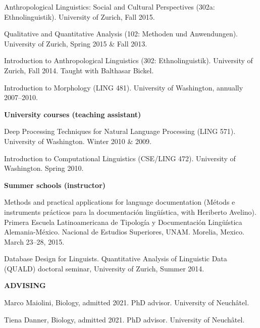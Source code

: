 \documentclass[11pt]{article}
\newcommand{\hangpara}{
 \setlength{\parindent}{0in} %
 \hangindent=0.42in %
}
\begin{document}
\vskip 6pt
\hangpara Anthropological Linguistics: Social and Cultural Perspectives (302a: Ethnolinguistik). University of Zurich, Fall 2015.

\vskip 6pt
\hangpara Qualitative and Quantitative Analysis (102: Methoden und Anwendungen). University of Zurich, Spring 2015 \& Fall 2013.

\vskip 6pt
\hangpara Introduction to Anthropological Linguistics (302: Ethnolinguistik). University of Zurich, Fall 2014. Taught with Balthasar Bickel.

\vskip 6pt
\hangpara Introduction to Morphology (LING 481). University of Washington, annually 2007--2010.

\begin{flushleft}
{\bf University courses (teaching assistant)}
\end{flushleft}
\hangpara Deep Processing Techniques for Natural Language Processing (LING 571). University of Washington. Winter 2010 \& 2009.

\vskip 6pt
\hangpara %
Introduction to Computational Linguistics (CSE/LING 472). University of Washington. Spring 2010.

\begin{flushleft}
{\bf Summer schools (instructor)}
\end{flushleft}
\hangpara Methods and practical applications for language documentation (M{\'e}tods e instruments pr{\'a}cticos para la documentaci{\'o}n ling{\"u}{\'i}stica, with Heriberto Avelino). Primera Escuela Latinoamericana de Tipolog{\'i}a y Documentaci{\'o}n Ling{\"u}{\'i}stica Alemania-M{\'e}xico. Nacional de Estudios Superiores, UNAM. Morelia, Mexico. March 23--28, 2015.

\vskip 6pt
\hangpara Database Design for Linguists. Quantitative Analysis of Linguistic Data (QUALD) doctoral seminar, University of Zurich, Summer 2014.


\vskip 20pt
\begin{flushleft}
{\bf ADVISING}
\end{flushleft}

\hangpara
Marco Maiolini, Biology, admitted 2021. PhD advisor. University of Neuchâtel.

\hangpara
\vskip 6pt
Tiena Danner, Biology, admitted 2021. PhD advisor. University of Neuchâtel.
\end{document}
